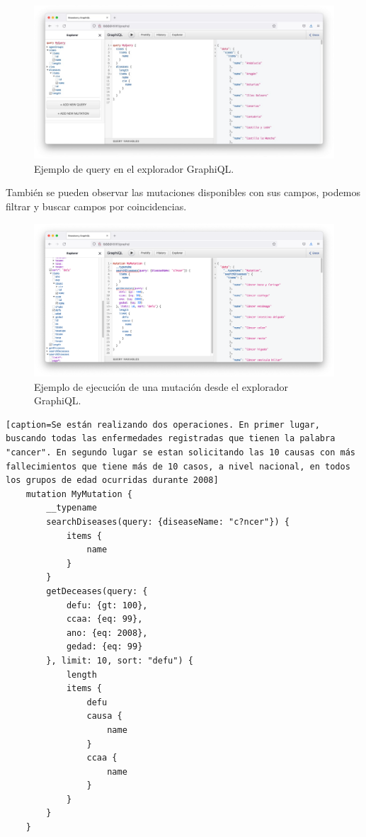 \FloatBarrier
\begin{figure}[h]
	\centering	
	\includegraphics[width=\textwidth]{doc/logos/imgs/queries-graph.jpg}
	\caption{ Ejemplo de query en el explorador GraphiQL. }
    \label{fig:graficos-GraphiQL}
\end{figure}
\FloatBarrier

También se pueden observar las mutaciones disponibles con sus campos, podemos filtrar y
buscar campos por coincidencias.

\FloatBarrier
\begin{figure}[h]
	\centering	
	\includegraphics[width=\textwidth]{doc/logos/imgs/mutaciones-graph.png}
	\caption{ Ejemplo de ejecución de una mutación desde el explorador GraphiQL. }
    \label{fig:graficos-GraphiQL}
\end{figure}
\FloatBarrier

\begin{lstlisting}[caption=Se están realizando dos operaciones. En primer lugar, buscando todas las enfermedades registradas que tienen la palabra "cancer". En segundo lugar se estan solicitando las 10 causas con más fallecimientos que tiene más de 10 casos, a nivel nacional, en todos los grupos de edad ocurridas durante 2008] 
    mutation MyMutation {
        __typename
        searchDiseases(query: {diseaseName: "c?ncer"}) {
            items {
                name
            }
        }
        getDeceases(query: {
            defu: {gt: 100}, 
            ccaa: {eq: 99}, 
            ano: {eq: 2008}, 
            gedad: {eq: 99}
        }, limit: 10, sort: "defu") {
            length
            items {
                defu
                causa {
                    name
                }
                ccaa {
                    name
                }
            }
        }
    }
\end{lstlisting}

